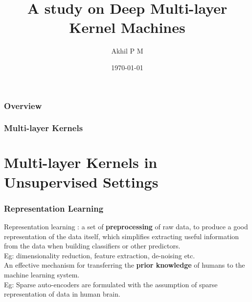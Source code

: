 \documentclass[a4paper,compress,svgnames]{beamer}
\title[KM for DL]{A study on Deep Multi-layer Kernel Machines} %
\author{Akhil P M} %
\institute[] %
{
Supervisor : Sumitra S. \\ %
}
\date{\today} %
\begin{document}
\begin{frame}
\titlepage %
\end{frame}

\begin{frame}
\frametitle{Overview} %
\tableofcontents %
\end{frame}

\begin{frame}
\frametitle{Multi-layer Kernels}
\setlength{\DTbaselineskip}{25pt}
\DTsetlength{1em}{1em}{0.1em}{1pt}{4pt}
\end{frame}

\section{Multi-layer Kernels in Unsupervised Settings} %
\begin{frame}
\frametitle{Representation Learning}
Representation learning : a set of \textbf{preprocessing} of raw data, to produce a good representation of the data itself, which simplifies extracting useful information from the data when building classifiers or other predictors.\\
\vspace{0.1in}
Eg: dimensionality reduction, feature extraction, de-noising etc.\\
\vspace{0.3in}
An effective mechanism for transferring the \textbf{prior knowledge} of humans to the machine learning system.\\
\vspace{0.1in}
Eg: Sparse auto-encoders are formulated with the assumption of sparse representation of data in human brain.
\end{frame}
\end{document}
